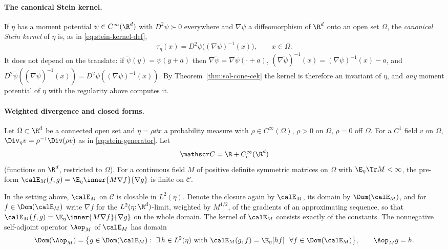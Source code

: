 \documentclass[../main.tex]{subfiles}
\begin{document}
\paragraph{The canonical Stein kernel.}
If $\eta$ has a moment potential $\psi\in C^\infty(\R^d)$ with $D^2\psi\succ0$ everywhere and
$\nabla\psi$ a diffeomorphism of $\R^d$ onto an open set $\Omega$, the \emph{canonical Stein
kernel} of $\eta$ is, as in \eqref{eq:stein-kernel-def},
\begin{equation}
  \tau_\eta(x)=D^2\psi\bigl((\nabla\psi)^{-1}(x)\bigr),\qquad x\in\Omega.
  \label{eq:sol-cone-kernel-def}
\end{equation}
It does not depend on the translate: if $\tilde\psi(y)=\psi(y+a)$ then
$\nabla\tilde\psi=\nabla\psi(\cdot+a)$, $(\nabla\tilde\psi)^{-1}(x)=(\nabla\psi)^{-1}(x)-a$,
and $D^2\tilde\psi((\nabla\tilde\psi)^{-1}(x))=D^2\psi((\nabla\psi)^{-1}(x))$.  By
Theorem~\ref{thm:sol-cone-cek} the kernel is therefore an invariant of $\eta$, and \emph{any}
moment potential of $\eta$ with the regularity above computes it.

\paragraph{Weighted divergence and closed forms.}
Let $\Omega\subset\R^d$ be a connected open set and $\eta=\rho\dd x$ a probability measure
with $\rho\in C^\infty(\Omega)$, $\rho>0$ on $\Omega$, $\rho=0$ off $\Omega$.  For a $C^1$
field $v$ on $\Omega$, $\Div_\eta v=\rho^{-1}\Div(\rho v)$ as in \eqref{eq:stein-generator}.
Let
\[
  \mathscr C=\R+C_c^\infty(\R^d)
\]
(functions on $\R^d$, restricted to $\Omega$).  For a continuous field $M$ of positive
definite symmetric matrices on $\Omega$ with $\E_\eta\Tr M<\infty$, the pre-form
$\calE_M(f,g)=\E_\eta\inner{M\nabla f}{\nabla g}$ is finite on $\mathscr C$.

\begin{lemma}
\label{lem:sol-cone-closable}
In the setting above, $\calE_M$ on $\mathscr C$ is closable in $L^2(\eta)$.  Denote the closure
again by $\calE_M$, its domain by $\Dom(\calE_M)$, and for $f\in\Dom(\calE_M)$ write
$\nabla f$ for the $L^2(\eta;\R^d)$-limit, weighted by $M^{1/2}$, of the gradients of an
approximating sequence, so that $\calE_M(f,g)=\E_\eta\inner{M\nabla f}{\nabla g}$ on the
whole domain.  The kernel of $\calE_M$ consists exactly of the constants.  The nonnegative
self-adjoint operator $\Aop_M$ of $\calE_M$ has domain
\[
  \Dom(\Aop_M)=\bigl\{g\in\Dom(\calE_M):\ \exists\,h\in L^2(\eta)\ \text{with}\
  \calE_M(g,f)=\E_\eta[hf]\ \ \forall f\in\Dom(\calE_M)\bigr\},\qquad \Aop_Mg=h .
\]
\end{lemma}
\end{document}
